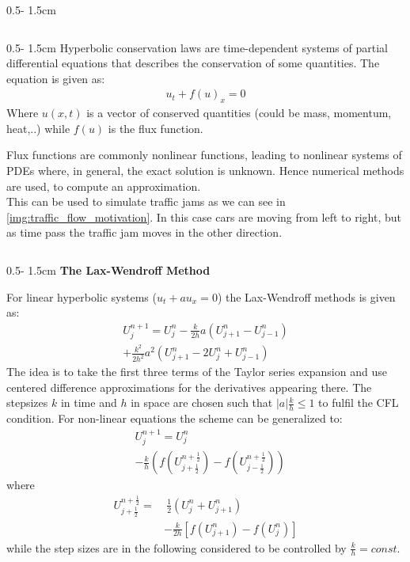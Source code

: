 \documentclass{uibposter}
\begin{document}
\begin{frame}[fragile]
\begin{columns}
\begin{column}{0.5\textwidth - 1.5cm}
\begin{column}{0.5\textwidth - 1.5cm}
Hyperbolic conservation laws are time-dependent systems of partial differential equations that describes the conservation of some quantities. The equation is given as:
\begin{align*}
    u_t + f(u)_x = 0
\end{align*}
Where $u(x,t)$ is a vector of conserved quantities (could be mass, momentum, heat,..) while $f(u)$ is the flux function.

Flux functions are commonly nonlinear functions, leading to nonlinear systems of PDEs where, in general, the exact solution is unknown. Hence numerical methods are used, to compute an approximation. \\
This can be used to simulate traffic jams as we can see in \cref{img:traffic_flow_motivation}. In this case cars are moving from left to right, but as time pass the traffic jam moves in the other direction. 

\end{column}
\begin{column}{0.5\textwidth - 1.5cm}
\textbf{The Lax-Wendroff Method}
\vspace{-1cm}

For linear hyperbolic systems ($u_t + au_x = 0$) the Lax-Wendroff methods is given as:
\begin{align*}
U_j^{n+1} = U_j^n - \frac{k}{2h}a(U_{j+1}^n  - U_{j-1}^n)\\
+ \frac{k^2}{2h^2}a^2(U_{j+1}^n - 2U_j^n + U_{j-1}^n)
\end{align*}
The idea is to take the first three terms of the Taylor series expansion and use centered difference approximations for the derivatives appearing there. The stepsizes $k$ in time and $h$ in space are chosen such that $|a|\frac{k}{h} \leq 1$ to fulfil the CFL condition.
For non-linear equations the scheme can be generalized to:
\begin{align*}
&U_j^{n+1} = U_j^n\\
&- \frac{k}{h}\left(f\left(U_{j+\frac{1}{2}}^{n+\frac{1}{2}}\right) - f\left(U_{j-\frac{1}{2}}^{n+\frac{1}{2}}\right)\right)
\end{align*}
where  
\begin{align*}
U_{j+\frac{1}{2}}^{n+\frac{1}{2}} =&~ \frac{1}{2} (U_j^n + U_{j+1}^n)\\
&- \frac{k}{2h}[f(U_{j+1}^n) - f(U_j^n)]
\end{align*}
while the step sizes are in the following considered to be controlled by $\frac{k}{h} = const$. 


\end{column}
\end{column}
\end{columns}
\end{frame}
\end{document}
